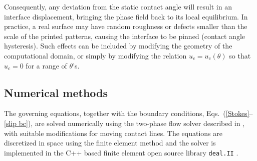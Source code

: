 Consequently, any deviation from the static contact angle will result in an interface displacement, bringing the phase field back to its local equilibrium. In practice, a real surface may have random roughness or defects smaller than the scale of the printed patterns, causing the interface to be pinned (\ie contact angle hysteresis). Such effects can be included by modifying the geometry of the computational domain, or simply by modifying the relation $u_c=u_c(\theta)$ so that $u_c=0$ for a range of $\theta$'s. %


\subsection{Numerical methods} \label{numm}

The governing equations, together with the boundary conditions, Eqs.\ (\ref{Stokes}--\ref{slip bc}), are solved numerically using the two-phase flow solver described in \cite{MartinHPC}, with suitable modifications for moving contact lines. The equations are discretized in space using the finite element method and the solver is implemented in the C++ based finite element open source library \texttt{deal.II} \citep{DEAL1, DEAL2}.


